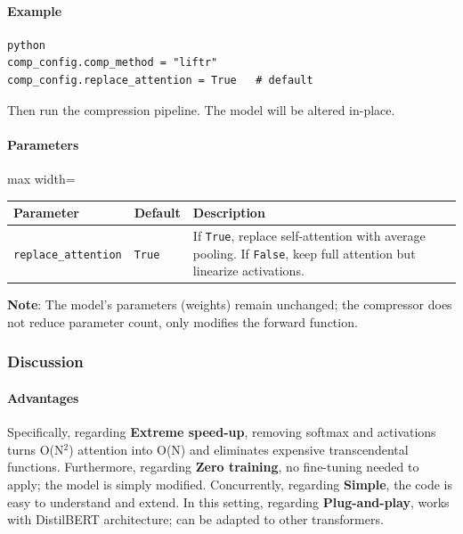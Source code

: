 \paragraph{Example}

\vspace{0.5em}
\begin{mdframed}[backgroundcolor=codebg, linecolor=codeframe, linewidth=1pt, roundcorner=4pt, innerleftmargin=2pt, innerrightmargin=5pt, innertopmargin=5pt, innerbottommargin=5pt]
\begin{lstlisting}
python
comp_config.comp_method = "liftr"
comp_config.replace_attention = True   # default
\end{lstlisting}
\end{mdframed}
\vspace{0.5em}

Then run the compression pipeline. The model will be altered in-place.

\paragraph{Parameters}

\begin{center}
\begin{adjustbox}{max width=\columnwidth}
\renewcommand{\arraystretch}{1.2}
\begin{tabular}{lll}
\toprule
Parameter & Default & Description \\
\midrule
\texttt{replace\_attention} & \texttt{True} & If \texttt{True}, replace self-attention with average pooling. If \texttt{False}, keep full attention but linearize activations. \\

\bottomrule
\end{tabular}
\end{adjustbox}
\end{center}
\textbf{Note}: The model's parameters (weights) remain unchanged; the compressor does not reduce parameter count, only modifies the forward function.


\subsubsection*{Discussion}

\paragraph{Advantages}

Specifically, regarding \textbf{Extreme speed-up}, removing softmax and activations turns O(N$^2$) attention into O(N) and eliminates expensive transcendental functions. Furthermore, regarding \textbf{Zero training}, no fine-tuning needed to apply; the model is simply modified. Concurrently, regarding \textbf{Simple}, the code is easy to understand and extend. In this setting, regarding \textbf{Plug-and-play}, works with DistilBERT architecture; can be adapted to other transformers.


